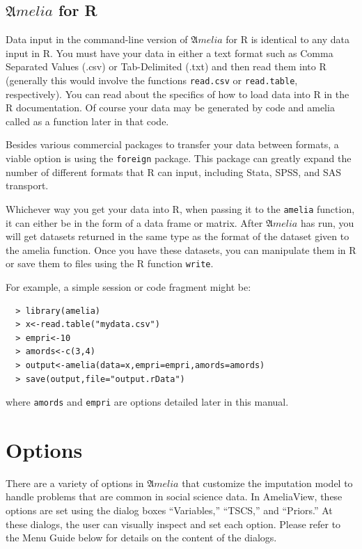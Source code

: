 \documentclass[12pt,titlepage]{article}
\newcommand{\Amelia}{\ensuremath{\mathfrak Amelia} }
\begin{document}
\subsection{\Amelia for R}
\label{sec:data-r}
Data input in the command-line version of ${\mathfrak Amelia}$ for R is identical to any data input in R.  You must have your data in either a text format such as Comma Separated Values (.csv) or Tab-Delimited (.txt) and then read them into R (generally this would involve the functions \texttt{read.csv} or \texttt{read.table}, respectively).  You can read about the specifics of how to load data into R in the R documentation.  Of course your data may be generated by code and amelia called as a function later in that code.  

Besides various commercial packages to transfer your data between formats, a viable option is using the \texttt{foreign} package.  This package can greatly expand the number of different formats that R can input, including Stata, SPSS, and SAS transport.  

Whichever way you get your data into R, when passing it to the \texttt{amelia} function, it can either be in the form of a data frame or matrix.  After ${\mathfrak Amelia}$ has run, you will get datasets returned in the same type as the format of the dataset given to the amelia function.  Once you have these datasets, you can manipulate them in R or save them to files using the R function \texttt{write}.  

For example, a simple session or code fragment might be:
  \begin{verbatim}
  > library(amelia)
  > x<-read.table("mydata.csv")
  > empri<-10
  > amords<-c(3,4)
  > output<-amelia(data=x,empri=empri,amords=amords)
  > save(output,file="output.rData")
  \end{verbatim}
where \texttt{amords} and \texttt{empri} are options detailed later in this manual.


\section{Options}
\label{sec:options}
There are a variety of options in \Amelia that customize the imputation model to handle problems that are common in social science data.  In AmeliaView, these options are set using the dialog boxes ``Variables,'' ``TSCS,'' and ``Priors.''  At these dialogs, the user can visually inspect and set each option.  Please refer to the Menu Guide below for details on the content of the dialogs.  
\end{document}
